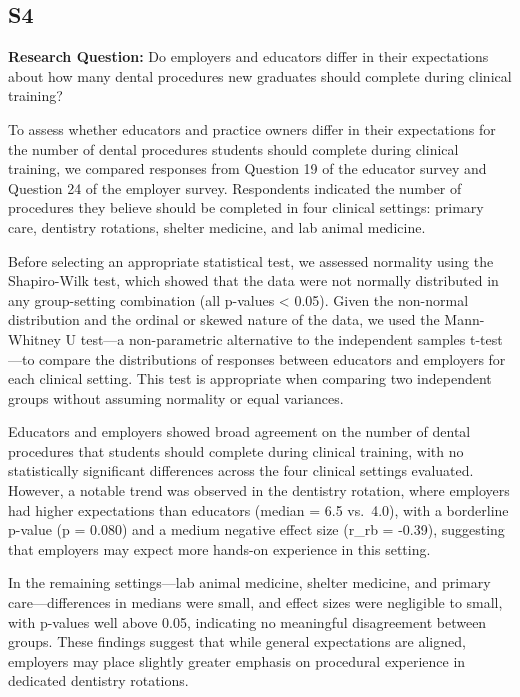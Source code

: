 \documentclass[
  12pt,
  letterpaper,
  DIV=11,
  numbers=noendperiod]{scrartcl}
\numberwithin{figure}{section}
\numberwithin{table}{section}
\begin{document}
\subsection{S4}\label{s4}

\textbf{Research Question:} Do employers and educators differ in their
expectations about how many dental procedures new graduates should
complete during clinical training?

To assess whether educators and practice owners differ in their
expectations for the number of dental procedures students should
complete during clinical training, we compared responses from Question
19 of the educator survey and Question 24 of the employer survey.
Respondents indicated the number of procedures they believe should be
completed in four clinical settings: primary care, dentistry rotations,
shelter medicine, and lab animal medicine.

Before selecting an appropriate statistical test, we assessed normality
using the Shapiro-Wilk test, which showed that the data were not
normally distributed in any group-setting combination (all p-values
\textless{} 0.05). Given the non-normal distribution and the ordinal or
skewed nature of the data, we used the Mann-Whitney U test---a
non-parametric alternative to the independent samples t-test---to
compare the distributions of responses between educators and employers
for each clinical setting. This test is appropriate when comparing two
independent groups without assuming normality or equal variances.

Educators and employers showed broad agreement on the number of dental
procedures that students should complete during clinical training, with
no statistically significant differences across the four clinical
settings evaluated. However, a notable trend was observed in the
dentistry rotation, where employers had higher expectations than
educators (median = 6.5 vs.~4.0), with a borderline p-value (p = 0.080)
and a medium negative effect size (r\_rb = -0.39), suggesting that
employers may expect more hands-on experience in this setting.

In the remaining settings---lab animal medicine, shelter medicine, and
primary care---differences in medians were small, and effect sizes were
negligible to small, with p-values well above 0.05, indicating no
meaningful disagreement between groups. These findings suggest that
while general expectations are aligned, employers may place slightly
greater emphasis on procedural experience in dedicated dentistry
rotations.
\end{document}
